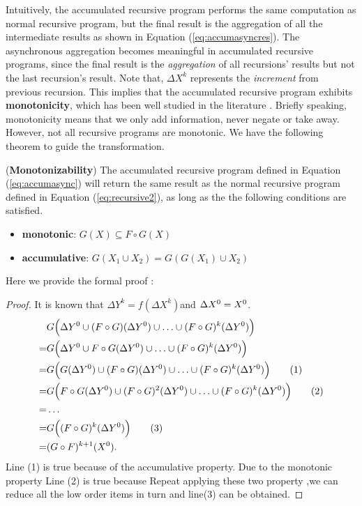 Intuitively, the accumulated recursive program performs the same computation as normal recursive program, but the final result is the aggregation of all the intermediate results as shown in Equation (\ref{eq:accumasyncres}). The asynchronous aggregation becomes meaningful in accumulated recursive programs, since the final result is the \emph{aggregation} of all recursions' results but not the last recursion's result. Note that, $\Delta X^{k}$ represents the \emph{increment} from previous recursion. This implies that the accumulated recursive program exhibits \textbf{monotonicity}, which has been well studied in the literature \cite{Hellerstein:2010:DIE:1860702.1860704,calm,Lam:2013:SDE:2510649.2511289,Wang:2015:AFR:2824032.2824052}. Briefly speaking, monotonicity means that we only add information, never negate or take away. However, not all recursive programs are monotonic. We have the following theorem to guide the transformation.
\begin{theorem}
	\label{th:monotone}
	(\textbf{Monotonizability}) The accumulated recursive program defined in Equation (\ref{eq:accumasync}) will return the same result as the normal recursive program defined in Equation (\ref{eq:recursive2}), as long as the the following conditions are satisfied.
	\begin{itemize}
		\item \textbf{monotonic}: $G(X)\subseteq F\circ G(X)$
		\item \textbf{accumulative}: $G(X_1\cup X_2)=G(G(X_1)\cup X_2)$
	\end{itemize}
	
\end{theorem}
Here we provide the formal proof :
 \begin{proof}
  It is known that $\Delta Y^k=f(\Delta X^k)$and $\Delta X^0=X^0\\$.
 \begin{align}
 &G\Big(\Delta Y^0\cup (F\circ G)(\Delta Y^0)\cup\ldots\cup (F\circ G)^k(\Delta Y^0)\Big)\notag \\
 =&G\Big(\Delta Y^0\cup F\circ G(\Delta Y^0)\cup \ldots \cup (F\circ G)^k(\Delta Y^0)\Big)    \notag\\
 =&G\Big(G(\Delta Y^0)\cup (F\circ G)(\Delta Y^0)\cup \ldots \cup (F\circ G)^k( \Delta Y^0)\Big)  \tag{1}\\
 =&G\Big(F\circ G(\Delta Y^0)\cup (F\circ G)^2(\Delta Y^0)\cup \ldots \cup (F\circ G)^k(\Delta Y^0)\Big) \tag{2}\\
 =& \ldots \notag \\
 =&G\Big((F\circ G)^k(\Delta Y^0)\Big)\tag{3}\\
 =&(G \circ F)^{k+1}(X^0).\notag
 \end{align}
  Line (1) is true because of the accumulative property. Due to the monotonic property Line (2) is true because  Repeat applying these two property ,we can reduce all the low order items in turn and line(3) can be obtained. 
 \end{proof}


